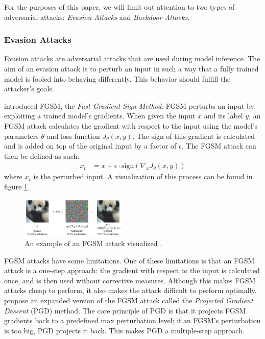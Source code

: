 \documentclass[11pt]{article}
\begin{document}
For the purposes of this paper, we will limit out attention to two types of adversarial attacks: \textit{Evasion Attacks} and \textit{Backdoor Attacks}.

\subsubsection{Evasion Attacks}
Evasion attacks are adversarial attacks that are used during model inference.
The aim of an evasion attack is to perturb an input in such a way that a fully trained model is fooled into behaving differently.
This behavior should fulfill the attacker's goals.

\citet{goodfellow2015explaining} introduced FGSM, the \textit{Fast Gradient Sign Method}.
FGSM perturbs an input by exploiting a trained model's gradients.
When given the input $x$ and its label $y$, an FGSM attack calculates the gradient with respect to the input using the model's parameters $\theta$ and loss function $J_\theta(x, y)$.
The sign of this gradient is calculated and is added on top of the original input by a factor of $\epsilon$.
The FGSM attack can then be defined as such:
\begin{align*}
  x_t &= x + \epsilon \cdot \text{sign}(\nabla_x J_\theta(x, y))
\end{align*}
where $x_t$ is the perturbed input.
A visualization of this process can be found in figure \ref{fig:fgsm}.

\begin{figure}[h]
  \centering
  \includegraphics[width=0.45\textwidth]{fgsm.png}
  \caption{An example of an FGSM attack visualized \citep{goodfellow2015explaining}.}
  \label{fig:fgsm}
\end{figure}

FGSM attacks have some limitations.
One of these limitations is that an FGSM attack is a one-step approach: the gradient with respect to the input is calculated once, and is then used without corrective measures.
Although this makes FGSM attacks cheap to perform, it also makes the attack difficult to perform optimally.
\citet{madry2018towards} propose an expanded version of the FGSM attack called the \textit{Projected Gradient Descent} (PGD) method.
The core principle of PGD is that it projects FGSM gradients back to a predefined max perturbation level; if an FGSM's perturbation is too big, PGD projects it back.
This makes PGD a multiple-step approach.
\end{document}
